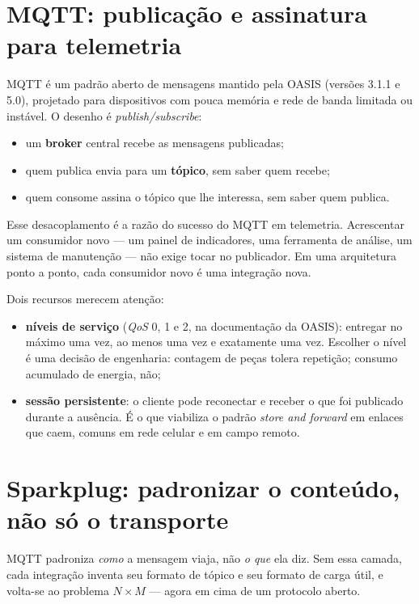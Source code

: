 
\section{MQTT: publicação e assinatura para telemetria}

MQTT é um padrão aberto de mensagens mantido pela OASIS (versões 3.1.1 e 5.0), projetado para
dispositivos com pouca memória e rede de banda limitada ou instável. O desenho é
\emph{publish/subscribe}:

\begin{itemize}
  \item um \textbf{broker} central recebe as mensagens publicadas;
  \item quem publica envia para um \textbf{tópico}, sem saber quem recebe;
  \item quem consome assina o tópico que lhe interessa, sem saber quem publica.
\end{itemize}

Esse desacoplamento é a razão do sucesso do MQTT em telemetria. Acrescentar um consumidor novo ---
um painel de indicadores, uma ferramenta de análise, um sistema de manutenção --- não exige tocar no
publicador. Em uma arquitetura ponto a ponto, cada consumidor novo é uma integração nova.

Dois recursos merecem atenção:

\begin{itemize}
  \item \textbf{níveis de serviço} (\emph{QoS} 0, 1 e 2, na documentação da OASIS): entregar no máximo
        uma vez, ao menos uma vez e exatamente uma vez. Escolher o nível é uma decisão de engenharia:
        contagem de peças tolera repetição; consumo acumulado de energia, não;
  \item \textbf{sessão persistente}: o cliente pode reconectar e receber o que foi publicado durante
        a ausência. É o que viabiliza o padrão \emph{store and forward} em enlaces que caem, comuns em
        rede celular e em campo remoto.
\end{itemize}

\section{Sparkplug: padronizar o conteúdo, não só o transporte}

MQTT padroniza \emph{como} a mensagem viaja, não \emph{o que} ela diz. Sem essa camada, cada
integração inventa seu formato de tópico e seu formato de carga útil, e volta-se ao problema
$N \times M$ --- agora em cima de um protocolo aberto.

